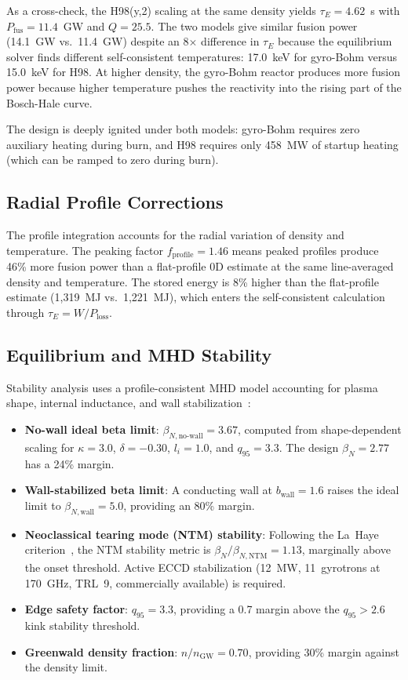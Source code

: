 \documentclass[11pt,a4paper]{article}
\begin{document}
As a cross-check, the H98(y,2) scaling at the same density yields $\tau_E = 4.62$~s with $P_{\text{fus}} = 11.4$~GW and $Q = 25.5$. The two models give similar fusion power (14.1~GW vs.~11.4~GW) despite an 8$\times$ difference in $\tau_E$ because the equilibrium solver finds different self-consistent temperatures: 17.0~keV for gyro-Bohm versus 15.0~keV for H98. At higher density, the gyro-Bohm reactor produces more fusion power because higher temperature pushes the reactivity into the rising part of the Bosch-Hale curve.

The design is deeply ignited under both models: gyro-Bohm requires zero auxiliary heating during burn, and H98 requires only 458~MW of startup heating (which can be ramped to zero during burn).

\subsection{Radial Profile Corrections}

The profile integration accounts for the radial variation of density and temperature. The peaking factor $f_{\text{profile}} = 1.46$ means peaked profiles produce 46\% more fusion power than a flat-profile 0D estimate at the same line-averaged density and temperature. The stored energy is 8\% higher than the flat-profile estimate (1,319~MJ vs.~1,221~MJ), which enters the self-consistent calculation through $\tau_E = W / P_{\text{loss}}$.

\subsection{Equilibrium and MHD Stability}
\label{sec:mhd}

Stability analysis uses a profile-consistent MHD model accounting for plasma shape, internal inductance, and wall stabilization~\cite{iter1999,sweeney2020}:

\begin{itemize}[nosep]
    \item \textbf{No-wall ideal beta limit}: $\beta_{N,\text{no-wall}} = 3.67$, computed from shape-dependent scaling for $\kappa = 3.0$, $\delta = -0.30$, $l_i = 1.0$, and $q_{95} = 3.3$. The design $\beta_N = 2.77$ has a 24\% margin.
    \item \textbf{Wall-stabilized beta limit}: A conducting wall at $b_{\text{wall}} = 1.6$ raises the ideal limit to $\beta_{N,\text{wall}} = 5.0$, providing an 80\% margin.
    \item \textbf{Neoclassical tearing mode (NTM) stability}: Following the La~Haye criterion~\cite{lahaye2006}, the NTM stability metric is $\beta_N / \beta_{N,\text{NTM}} = 1.13$, marginally above the onset threshold. Active ECCD stabilization (12~MW, 11~gyrotrons at 170~GHz, TRL~9, commercially available) is required.
    \item \textbf{Edge safety factor}: $q_{95} = 3.3$, providing a 0.7 margin above the $q_{95} > 2.6$ kink stability threshold.
    \item \textbf{Greenwald density fraction}: $n/n_{\text{GW}} = 0.70$, providing 30\% margin against the density limit.
\end{itemize}
\end{document}
